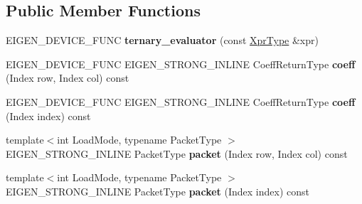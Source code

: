 \subsection*{Public Member Functions}
\begin{DoxyCompactItemize}
\item 
\mbox{\label{struct_eigen_1_1internal_1_1ternary__evaluator_3_01_cwise_ternary_op_3_01_ternary_op_00_01_arg1_daf42d21bcfee99cfa54e03ffa9506fc_acb941aa37cc621f7b42688de3d8d4e1a}} 
E\+I\+G\+E\+N\+\_\+\+D\+E\+V\+I\+C\+E\+\_\+\+F\+U\+NC {\bfseries ternary\+\_\+evaluator} (const \mbox{\hyperlink{class_eigen_1_1_cwise_ternary_op}{Xpr\+Type}} \&xpr)
\item 
\mbox{\label{struct_eigen_1_1internal_1_1ternary__evaluator_3_01_cwise_ternary_op_3_01_ternary_op_00_01_arg1_daf42d21bcfee99cfa54e03ffa9506fc_ae175d06ff8ac72ab3d03fd2299658bd9}} 
E\+I\+G\+E\+N\+\_\+\+D\+E\+V\+I\+C\+E\+\_\+\+F\+U\+NC E\+I\+G\+E\+N\+\_\+\+S\+T\+R\+O\+N\+G\+\_\+\+I\+N\+L\+I\+NE Coeff\+Return\+Type {\bfseries coeff} (Index row, Index col) const
\item 
\mbox{\label{struct_eigen_1_1internal_1_1ternary__evaluator_3_01_cwise_ternary_op_3_01_ternary_op_00_01_arg1_daf42d21bcfee99cfa54e03ffa9506fc_a7ec7e52d6ed5e486486635ad5a6d225c}} 
E\+I\+G\+E\+N\+\_\+\+D\+E\+V\+I\+C\+E\+\_\+\+F\+U\+NC E\+I\+G\+E\+N\+\_\+\+S\+T\+R\+O\+N\+G\+\_\+\+I\+N\+L\+I\+NE Coeff\+Return\+Type {\bfseries coeff} (Index index) const
\item 
\mbox{\label{struct_eigen_1_1internal_1_1ternary__evaluator_3_01_cwise_ternary_op_3_01_ternary_op_00_01_arg1_daf42d21bcfee99cfa54e03ffa9506fc_a38c0c9565d1cfb1c66329ccd12ea3b77}} 
{\footnotesize template$<$int Load\+Mode, typename Packet\+Type $>$ }\\E\+I\+G\+E\+N\+\_\+\+S\+T\+R\+O\+N\+G\+\_\+\+I\+N\+L\+I\+NE Packet\+Type {\bfseries packet} (Index row, Index col) const
\item 
\mbox{\label{struct_eigen_1_1internal_1_1ternary__evaluator_3_01_cwise_ternary_op_3_01_ternary_op_00_01_arg1_daf42d21bcfee99cfa54e03ffa9506fc_a201e2597c52d6d1f569cd4e84e31a072}} 
{\footnotesize template$<$int Load\+Mode, typename Packet\+Type $>$ }\\E\+I\+G\+E\+N\+\_\+\+S\+T\+R\+O\+N\+G\+\_\+\+I\+N\+L\+I\+NE Packet\+Type {\bfseries packet} (Index index) const
\end{DoxyCompactItemize}
